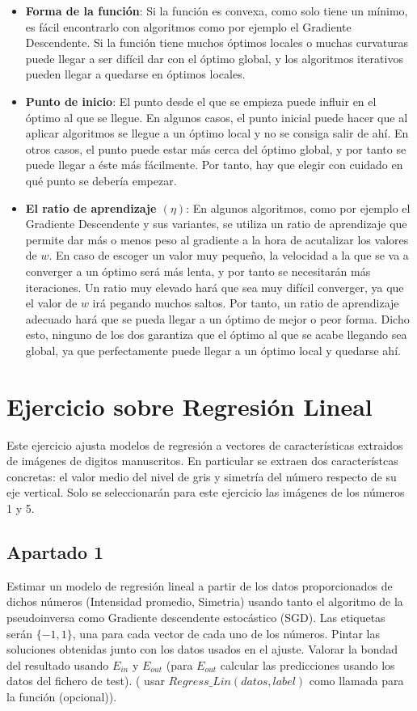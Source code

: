 \documentclass[11pt,a4paper]{article}
\begin{document}
\begin{itemize}[label=\textbullet]
	\item \textbf{Forma de la función}: Si la función es convexa, como solo tiene un mínimo, es fácil encontrarlo con
	algoritmos como por ejemplo el Gradiente Descendente. Si la función tiene muchos óptimos locales o muchas curvaturas
	puede llegar a ser difícil dar con el óptimo global, y los algoritmos iterativos pueden llegar a quedarse en óptimos
	locales.
	\item \textbf{Punto de inicio}: El punto desde el que se empieza puede influir en el óptimo al que se llegue. En algunos
	casos, el punto inicial puede hacer que al aplicar algoritmos se llegue a un óptimo local y no se consiga salir de ahí.
	En otros casos, el punto puede estar más cerca del óptimo global, y por tanto se puede llegar a éste más fácilmente. Por
	tanto, hay que elegir con cuidado en qué punto se debería empezar.
	\item \textbf{El ratio de aprendizaje $(\eta)$}: En algunos algoritmos, como por ejemplo el Gradiente Descendente y sus
	variantes, se utiliza un ratio de aprendizaje que permite dar más o menos peso al gradiente a la hora de acutalizar los
	valores de $w$. En caso de escoger un valor muy pequeño, la velocidad a la que se va a converger a un óptimo será más
	lenta, y por tanto se necesitarán más iteraciones. Un ratio muy elevado hará que sea muy difícil converger, ya que el
	valor de $w$ irá pegando muchos saltos. Por tanto, un ratio de aprendizaje adecuado hará que se pueda llegar a un óptimo
	de mejor o peor forma. Dicho esto, ninguno de los dos garantiza que el óptimo al que se acabe llegando sea global, ya
	que perfectamente puede llegar a un óptimo local y quedarse ahí.
\end{itemize}

\section{Ejercicio sobre Regresión Lineal}

Este ejercicio ajusta modelos de regresión a vectores de características extraidos de imágenes de digitos manuscritos. En
particular se extraen dos característcas concretas: el valor medio del nivel de gris y simetría del número respecto de su eje
vertical. Solo se seleccionarán para este ejercicio las imágenes de los números 1 y 5.

\subsection*{Apartado 1}
Estimar un modelo de regresión lineal a partir de los datos proporcionados de dichos números (Intensidad promedio, Simetria)
usando tanto el algoritmo de la pseudoinversa como Gradiente descendente estocástico (SGD). Las etiquetas serán
$ \lbrace -1, 1 \rbrace $, una para cada vector de cada uno de los números. Pintar las soluciones obtenidas junto con los
datos usados en el ajuste. Valorar la bondad del resultado usando $E_{in}$ y $E_{out}$ (para $E_{out}$ calcular las
predicciones usando los datos del fichero de test). ( usar $Regress\_Lin(datos, label)$ como llamada para la función
(opcional)).
\end{document}
